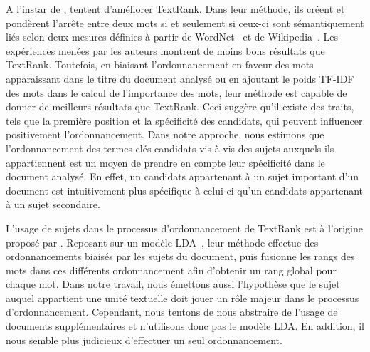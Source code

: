     A l'instar de ,
     tentent d'améliorer TextRank. Dans
    leur méthode, ils créent et pondèrent l'arrête entre deux mots si et
    seulement si ceux-ci sont sémantiquement liés selon deux mesures définies à
    partir de WordNet~\cite{miller1995wordnet} et de
    Wikipedia~\cite{milne2008wikipediasemanticrelatedness}. Les expériences
    menées par les auteurs montrent de moins bons résultats que TextRank.
    Toutefois, en biaisant l'ordonnancement en faveur des mots apparaissant dans
    le titre du document analysé ou en ajoutant le poids TF-IDF des mots dans le
    calcul de l'importance des mots, leur méthode est capable de donner de
    meilleurs résultats que TextRank. Ceci suggère qu'il existe des traits, tels
    que la première position et la spécificité des candidats, qui peuvent
    influencer positivement l'ordonnancement. Dans notre approche, nous estimons
    que l'ordonnancement des termes-clés candidats vis-à-vis des sujets auxquels
    ils appartiennent est un moyen de prendre en compte leur spécificité dans le
    document analysé. En effet, un candidats appartenant à un sujet important
    d'un document est intuitivement plus spécifique à celui-ci qu'un candidats
    appartenant à un sujet secondaire.

    L'usage de sujets dans le processus d'ordonnancement de TextRank est à
    l'origine proposé par . Reposant sur un
    modèle LDA~\cite[Latent Dirichlet Allocation]{blei2003lda}, leur méthode
    effectue des ordonnancements biaisés par les sujets du document, puis
    fusionne les rangs des mots dans ces différents ordonnancement afin
    d'obtenir un rang global pour chaque mot. Dans notre travail, nous émettons
    aussi l'hypothèse que le sujet auquel appartient une unité textuelle doit
    jouer un rôle majeur dans le processus d'ordonnancement. Cependant, nous
    tentons de nous abstraire de l'usage de documents supplémentaires et
    n'utilisons donc pas le modèle LDA. En addition, il nous semble plus
    judicieux d'effectuer un seul ordonnancement.

